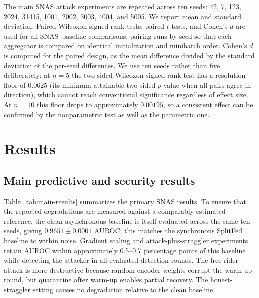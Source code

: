 \documentclass[pdflatex,sn-mathphys-num]{sn-jnl}
\begin{document}
The main SNAS attack experiments are repeated across ten seeds: 42, 7, 123, 2024, 31415, 1001, 2002, 3003, 4004, and 5005. We report mean and standard deviation. Paired Wilcoxon signed-rank tests, paired $t$-tests, and Cohen's $d$ are used for all SNAS--baseline comparisons, pairing runs by seed so that each aggregator is compared on identical initialization and minibatch order. Cohen's $d$ is computed for the paired design, as the mean difference divided by the standard deviation of the per-seed differences. We use ten seeds rather than five deliberately: at $n=5$ the two-sided Wilcoxon signed-rank test has a resolution floor of $0.0625$ (its minimum attainable two-sided $p$-value when all pairs agree in direction), which cannot reach conventional significance regardless of effect size. At $n=10$ this floor drops to approximately $0.00195$, so a consistent effect can be confirmed by the nonparametric test as well as the parametric one.

\section{Results}\label{sec:results}

\subsection{Main predictive and security results}

Table~\ref{tab:main-results} summarizes the primary SNAS results. To ensure that the reported degradations are measured against a comparably-estimated reference, the clean asynchronous baseline is itself evaluated across the same ten seeds, giving $0.9651\pm0.0001$ AUROC; this matches the synchronous SplitFed baseline to within noise. Gradient scaling and attack-plus-straggler experiments retain AUROC within approximately 0.5--0.7 percentage points of this baseline while detecting the attacker in all evaluated detection rounds. The free-rider attack is more destructive because random encoder weights corrupt the warm-up round, but quarantine after warm-up enables partial recovery. The honest-straggler setting causes no degradation relative to the clean baseline.
\end{document}
